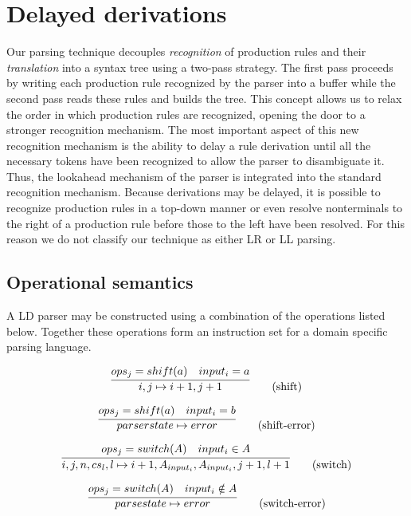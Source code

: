 \documentclass[A4]{sig-alternate}
\begin{document}
\section{Delayed derivations}

Our parsing technique decouples {\em recognition} of production rules and their {\em translation} into a syntax tree using a two-pass strategy.
The first pass proceeds by writing each production rule recognized by the parser into a buffer while the second pass reads these
rules and builds the tree.
This concept allows us to relax the order in which production rules are recognized, opening the door to a stronger recognition mechanism.
The most important aspect of this new recognition mechanism is the ability to delay a rule derivation until all the necessary tokens have been recognized
to allow the parser to disambiguate it.
Thus, the lookahead mechanism of the parser is integrated into the standard recognition mechanism.
Because derivations may be delayed, it is possible to recognize production rules in a top-down manner or even resolve nonterminals to the right of a 
production rule before those to the left have been resolved.
For this reason we do not classify our technique as either LR or LL parsing.

\subsection{Operational semantics}

A LD parser may be constructed using a combination of the operations listed below.
Together these operations form an instruction set for a domain specific parsing language.

\begin{equation}
\infer{i, j \mapsto i+1, j+1}{ops_j = shift(a) & input_i = a} \tag{shift}
\end{equation}

\begin{equation}
\infer{parserstate \mapsto error}{ops_j = shift(a) & input_i = b} \tag{shift-error}
\end{equation}

\begin{equation}
\infer{i, j, n, cs_l, l \mapsto i+1, A_{input_i}, A_{input_i}, j+1, l+1}{ops_j = switch(A) & input_i \in A} \tag{switch}
\end{equation}

\begin{equation}
\infer{parsestate \mapsto error}{ops_j = switch(A) & input_i \notin A} \tag{switch-error}
\end{equation}
\end{document}
